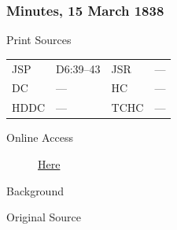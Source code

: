 		\subsubsection{Minutes, 15 March 1838}
			\label{EMS-1838-JS-15-MAR-1838}
			
			\begin{description}
					\item[Print Sources]
				\end{description}

					\begin{tabular}{p{0.5in}p{1in}p{0.5in}p{1in}}
					JSP	 	& D6:39--43		& JSR 		& --- \\
					DC	 	& ---		& HC 		& --- \\
					HDDC 	& ---		& TCHC 		& --- \\
					\end{tabular}
				
				\begin{description}
					\item[Online Access] \href{https://www.josephsmithpapers.org/paper-summary/minutes-15-march-1838/1}{Here}
				\end{description}
				
				\begin{description}
					\item[Background]
				\end{description}
				
				
				\begin{description}
					\item[Original Source]
				\end{description}
				
				
